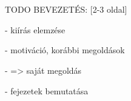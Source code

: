 \chapter{\bevezetes}

TODO BEVEZETÉS: [2-3 oldal]

- kiírás elemzése

- motiváció, korábbi megoldások

- => saját megoldás

- fejezetek bemutatása